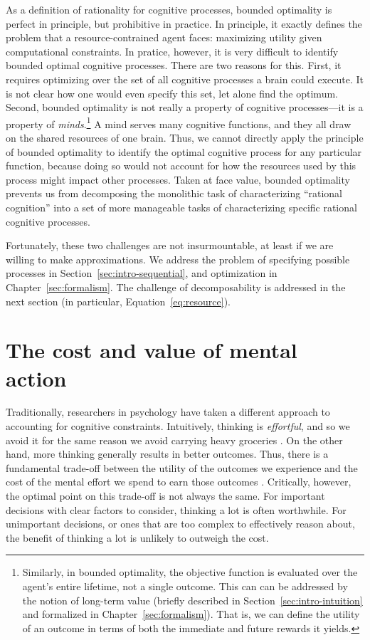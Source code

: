 As a definition of rationality for cognitive processes, bounded optimality is perfect in principle, but prohibitive in practice. In principle, it exactly defines the problem that a resource-contrained agent faces: maximizing utility given computational constraints. In pratice, however, it is very difficult to identify bounded optimal cognitive processes. There are two reasons for this. First, it requires optimizing over the set of all cognitive processes a brain could execute. It is not clear how one would even specify this set, let alone find the optimum. Second, bounded optimality is not really a property of cognitive processes---it is a property of \emph{minds}.\footnote{%
  Similarly, in bounded optimality, the objective function is evaluated over the agent's entire lifetime, not a single outcome. This can can be addressed by the notion of long-term value (briefly described in Section~\ref{sec:intro-intuition} and formalized in Chapter~\ref{sec:formalism}). That is, we can define the utility of an outcome in terms of both the immediate and future rewards it yields.
} A mind serves many cognitive functions, and they all draw on the shared resources of one brain. Thus, we cannot directly apply the principle of bounded optimality to identify the optimal cognitive process for any particular function, because doing so would not account for how the resources used by this process might impact other processes. Taken at face value, bounded optimality prevents us from decomposing the monolithic task of characterizing ``rational cognition'' into a set of more manageable tasks of characterizing specific rational cognitive processes.

Fortunately, these two challenges are not insurmountable, at least if we are willing to make approximations. We address the problem of specifying possible processes in Section~\ref{sec:intro-sequential}, and optimization in Chapter~\ref{sec:formalism}. The challenge of decomposability is addressed in the next section (in particular, Equation~\ref{eq:resource}).

\section{The cost and value of mental action}\label{sec:intro-cost}

Traditionally, researchers in psychology have taken a different approach to accounting for cognitive constraints. Intuitively, thinking is \emph{effortful}, and so we avoid it for the same reason we avoid carrying heavy groceries \citep{shenhav2017rational}. On the other hand, more thinking generally results in better outcomes. Thus, there is a fundamental trade-off between the utility of the outcomes we experience and the cost of the mental effort we spend to earn those outcomes \citep{kool2018mental}. Critically, however, the optimal point on this trade-off is not always the same. For important decisions with clear factors to consider, thinking a lot is often worthwhile. For unimportant decisions, or ones that are too complex to effectively reason about, the benefit of thinking a lot is unlikely to outweigh the cost.


